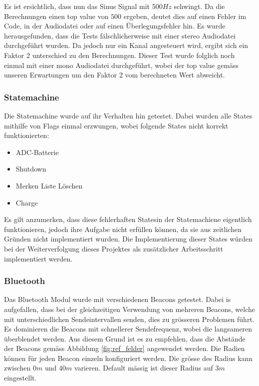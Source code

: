 Es ist ersichtlich, dass nun das Sinus Signal mit $500Hz$ schwingt. Da die Berechnungen einen top value von $500$ ergeben, deutet dies auf einen Fehler im Code, in der Audiodatei oder auf einen Überlegungsfehler hin. Es wurde herausgefunden, dass die Tests fälschlicherweise mit einer stereo Audiodatei durchgeführt wurden. Da jedoch nur ein Kanal angesteuert wird, ergibt sich ein Faktor $2$ unterschied zu den Berechnungen. Dieser Test wurde folglich noch einmal mit einer mono Audiodatei durchgeführt, wobei der top value gemäss unseren Erwartungen um den Faktor $2$ vom berechneten Wert abweicht.

\subsubsection{Statemachine}
Die Statemachine wurde auf ihr Verhalten hin getestet. Dabei wurden alle States mithilfe von Flags einmal erzwungen, wobei folgende States nicht korrekt funktionierten:

\begin{itemize}
	\item ADC-Batterie 
	\item Shutdown
	\item Merken Liste Löschen
	\item Charge
\end{itemize}

Es gilt anzumerken, dass diese \glqq fehlerhaften States\grqq in der Statemachiene eigentlich funktionieren, jedoch ihre Aufgabe nicht erfüllen können, da sie aus zeitlichen Gründen nicht implementiert wurden. Die Implementierung dieser States würden bei der Weiterverfolgung dieses Projektes als zusätzlicher Arbeitsschritt implementiert werden.

\subsubsection{Bluetooth}
Das Bluetooth Modul wurde mit verschiedenen Beacons getestet. Dabei is aufgefallen, dass bei der gleichzeitigen Verwendung von mehreren Beacons, welche mit unterschiedlichen Sendeintervallen senden, dies zu grösseren Problemen führt. Es dominieren die Beacons mit schnellerer Sendefrequenz, wobei die langsameren überblendet werden. Aus diesem Grund ist es zu empfehlen, dass die Abstände der Beacons gemäss Abbildung \ref{fig:ref_felder} angewendet werden. Die Radien können für jeden Beacon einzeln konfiguriert werden. Die grösse des Radius kann zwischen $0m$ und $40m$ varieren. Default mässig ist dieser Radius auf $3m$ eingestellt.

